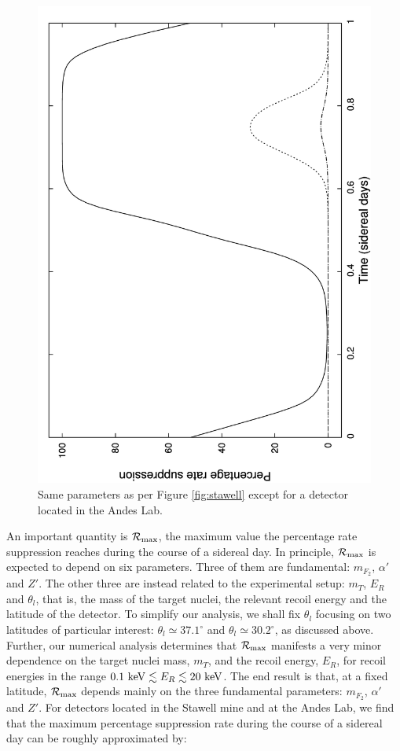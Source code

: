 \documentclass[12pt]{article}
\begin{document}
\begin{figure}[htpb]
    \centering
        \includegraphics[scale=0.5, angle=270]{fig4}
    \caption{Same parameters as per Figure \ref{fig:stawell} except for a detector located in the Andes Lab.}
    \label{fig:andes}
\end{figure}
%
An important quantity is ${\cal R} _{\max}$, the maximum value the percentage rate suppression reaches during the course of a sidereal day. In principle, ${\cal R} _{\max}$ is expected to depend on six parameters. Three of them are fundamental: $m _{F_2}$, $\alpha '$ and $Z'$. The other three are instead related to the experimental setup: $m _T$, $E _R$ and $\theta _l$, that is, the mass of the target nuclei, the relevant recoil energy and the latitude of the detector. To simplify our analysis, we shall fix $\theta _l$ focusing on two latitudes of particular interest: $\theta _l \simeq 37.1 ^{\circ}$ and $\theta _l \simeq 30.2 ^{\circ}$, as discussed above. Further, our numerical analysis determines that ${\cal R} _{\max}$ manifests a very minor dependence on the target nuclei mass, $m _T$, and the recoil energy, $E _R$, for recoil energies in the range $0.1 \ {\rm keV} \lesssim E _R \lesssim 20 \ {\rm keV}$. The end result is that, at a fixed latitude, ${\cal R} _{\max}$ depends mainly on the three fundamental parameters: $m _{F_2}$, $\alpha '$ and $Z'$. For detectors located in the Stawell mine and at the Andes Lab, we find that the maximum percentage suppression rate during the course of a sidereal day can be roughly approximated by:
\end{document}
